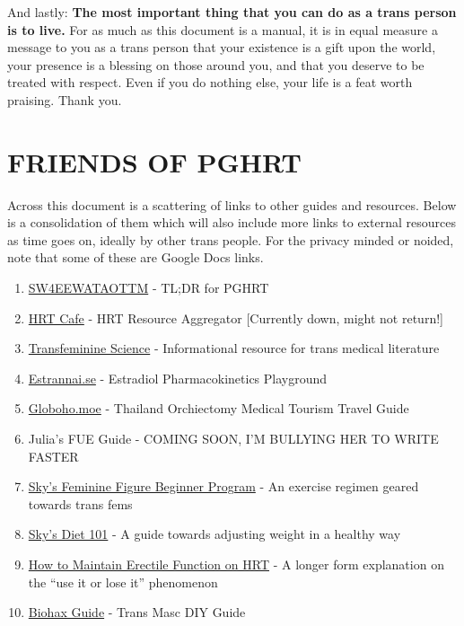 \documentclass{article}
\begin{document}
And lastly: \textbf{The most important thing that you can do as a trans person is to live.} For as much as this document is a manual, it is in equal measure a message to you as a trans person that your existence is a gift upon the world, your presence is a blessing on those around you, and that you deserve to be treated with respect. Even if you do nothing else, your life is a feat worth praising. Thank you.



\section*{FRIENDS OF PGHRT}\label{FOPGHRT}

Across this document is a scattering of links to other guides and resources. Below is a consolidation of them which will also include more links to external resources as time goes on, ideally by other trans people. For the privacy minded or noided, note that some of these are Google Docs links.

\begin{enumerate}
  \item \href{https://startwith4mgestradiolenanthateweeklyandtestatonetothreemonths.com/}{SW4EEWATAOTTM} - TL;DR for PGHRT
  \item \href{https://web.archive.org/web/20260310142419/https://hrtcafe.net/}{HRT Cafe} - HRT Resource Aggregator [Currently down, might not return!]
  \item \href{https://transfemscience.org/}{Transfeminine Science} - Informational resource for trans medical literature
  \item \href{https://estrannai.se}{Estrannai.se} - Estradiol Pharmacokinetics Playground
  \item \href{https://globoho.moe/}{Globoho.moe} - Thailand Orchiectomy Medical Tourism Travel Guide
  \item Julia's FUE Guide - COMING SOON, I'M BULLYING HER TO WRITE FASTER
  \item \href{https://docs.google.com/document/d/1-NyE5EY5TTaRRMhk7HlTbKJ7HifjEsA4jlDO1qKQVl0/edit?tab=t.0}{Sky's Feminine Figure Beginner Program} - An exercise regimen geared towards trans fems
  \item \href{https://docs.google.com/document/d/114sztSw1aVWM2pXLDl9NrHklyvewz3EmFiHiisjM71k/edit?tab=t.0}{Sky's Diet 101} - A guide towards adjusting weight in a healthy way
  \item \href{https://stainedglasswoman.substack.com/p/how-to-maintain-your-penis-function}{How to Maintain Erectile Function on HRT} - A longer form explanation on the “use it or lose it” phenomenon
  \item \href{https://mega.nz/folder/cfwSmBbY#ify6kaueB8SdDD1v12t2Dw}{Biohax Guide} - Trans Masc DIY Guide
\end{enumerate}
\end{document}
